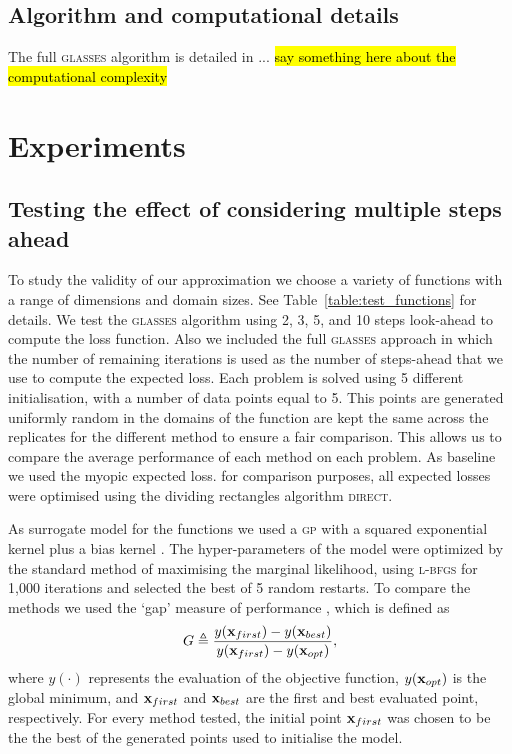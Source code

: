 \documentclass[twoside]{article}
\newcommand{\acr}[1]{\textsc{#1}\xspace}
\newcommand{\gp}{\acr{gp}}
\newcommand{\us}{\acr{glasses}}
\newcommand{\direct}{\acr{direct}}
\newcommand{\lbfgs}{\acr{l-bfgs}}
\begin{document}
\subsection{Algorithm and computational details}
The full \us algorithm is detailed in ... \hl{say something here about the computational complexity}



\section{Experiments}\label{sec:experiments}

\subsection{Testing the effect of considering multiple steps ahead}

To study the validity of our approximation we choose a variety of functions with a range of dimensions and domain sizes. See Table~\ref{table:test_functions} for details. We test the \us algorithm using 2, 3, 5, and 10 steps look-ahead to compute the loss function. Also we included the full \us approach in which the number of remaining iterations is used as the number of steps-ahead that we use to compute the expected loss. Each problem is solved using 5 different initialisation, with a number of data points equal to 5. This points are generated uniformly random in the domains of the function are kept the same across the replicates for the different method to ensure a fair comparison. This allows us to compare the average performance of each method on each problem. As baseline we used the myopic expected loss. for comparison purposes, all expected losses were optimised using the dividing rectangles algorithm \direct \citep{Jones1993}.

As surrogate model for the functions we used a \gp with a squared exponential kernel plus a bias kernel \citep{Rasmussen:2005:GPM:1162254}. The hyper-parameters of the model were optimized by the standard method of maximising the marginal likelihood, using \lbfgs \citep{Nocedal1980} for 1,000 iterations and selected the best of 5 random restarts.
To compare the methods we used the `gap' measure of performance \citep{Huang:2006}, which is defined as
\begin{equation}\nonumber
G \triangleq \frac{y(\mathbf{x}_{first})-y(\mathbf{x}_{best})}{y(\mathbf{x}_{first})-y(\mathbf{x}_{opt})} ,
\end{equation}
where $y(\cdot)$ represents the evaluation of the objective function, $y(\mathbf{x}_{opt})$ is the global minimum, and $\mathbf{x}_{first}$ and $\mathbf{x}_{best}$ are the first and best evaluated point, respectively. For every method tested, the initial point $\mathbf{x}_{first}$ was chosen to be the the best of the generated points used to initialise the model. 
\end{document}
